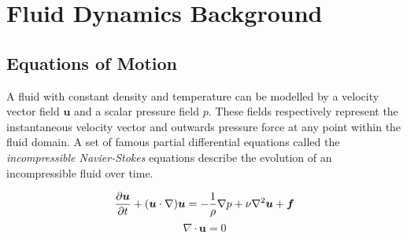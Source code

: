 \documentclass[a4paper, 11pt, titlepage]{article}
\renewcommand\i[1]{\textit{#1}}%
\begin{document}


\section{Fluid Dynamics Background}
\subsection{Equations of Motion}

A fluid with constant density and temperature can be modelled by a velocity
vector field $\bm{u}$ and a scalar pressure field $p$. These fields respectively
represent the  instantaneous velocity vector
and outwards pressure force at any point within the fluid domain. A set of
famous partial differential equations called the \i{incompressible
Navier-Stokes} equations describe the evolution of an incompressible fluid over time.

\begin{equation}\label{nsmomentum}
    \frac{\partial \bm{u}}{\partial t} + (\bm{u} \cdot \nabla)\bm{u} = - \frac{1}{\rho}\nabla p + \nu \nabla^2\bm{u} + \bm{f} \\
\end{equation}
\begin{equation}\label{nsincomp}
    \nabla \cdot \bm{u} = 0
\end{equation}
\end{document}
